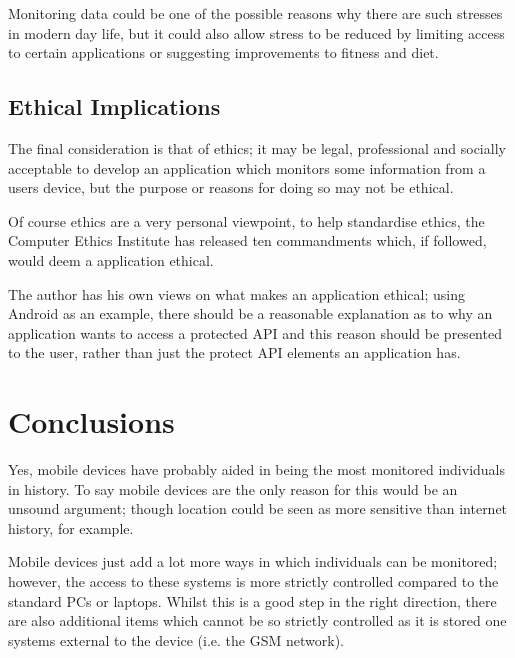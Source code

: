 \documentclass[12pt, a4paper]{article}
\begin{document}
Monitoring data could be one of the possible reasons why there are such
stresses in modern day life, but it could also allow stress to be reduced by
limiting access to certain applications or suggesting improvements to fitness
and diet.


\subsection{Ethical Implications}
The final consideration is that of ethics; it may be legal, professional and
socially acceptable to develop an application which monitors some information
from a users device, but the purpose or reasons for doing so may not be
ethical.

Of course ethics are a very personal viewpoint, to help standardise ethics, the
Computer Ethics Institute has released ten commandments\cite{ceiXcommandments} 
which, if followed, would deem a application ethical.

The author has his own views on what makes an application ethical; using Android
as an example, there should be a reasonable explanation as to why an
application wants to access a protected API and this reason should be presented
to the user, rather than just the protect API elements an application has.

\newpage
\section{Conclusions}

Yes, mobile devices have probably aided in being the most monitored individuals
in history. To say mobile devices are the only reason for this would be an
unsound argument; though location could be seen as more sensitive than internet
history, for example.

Mobile devices just add a lot more ways in which individuals can be monitored;
however, the access to these systems is more strictly controlled compared to
the standard PCs or laptops. Whilst this is a good step in the right direction,
there are also additional items which cannot be so strictly controlled as it is
stored one systems external to the device (i.e. the \gls{GSM} network).

\newpage


\end{document}
